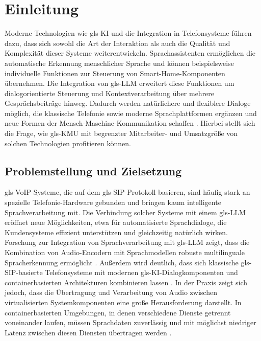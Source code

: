 \chapter{Einleitung}
\label{chap:einleitung}

Moderne Technologien wie \gls{gls-KI} und die Integration in Telefonsysteme führen dazu, dass sich sowohl die Art der Interaktion als auch die Qualität und Komplexität dieser Systeme weiterentwickeln. Sprachassistenten ermöglichen die automatische Erkennung menschlicher Sprache und können beispielsweise individuelle Funktionen zur Steuerung von Smart-Home-Komponenten übernehmen. Die Integration von \gls{gls-LLM} erweitert diese Funktionen um dialogorientierte Steuerung und Kontextverarbeitung über mehrere Gesprächsbeiträge hinweg. Dadurch werden natürlichere und flexiblere Dialoge möglich, die klassische Telefonie sowie moderne Sprachplattformen ergänzen und neue Formen der Mensch-Maschine-Kommunikation schaffen \parencite{Schmiedchen2026KI}. Hierbei stellt sich die Frage, wie \gls{gls-KMU} mit begrenzter Mitarbeiter- und Umsatzgrö\ss e von solchen Technologien profitieren können.

\section{Problemstellung und Zielsetzung}
\gls{gls-VoIP}-Systeme, die auf dem \gls{gls-SIP}-Protokoll basieren, sind häufig stark an spezielle Telefonie-Hardware gebunden und bringen kaum intelligente Sprachverarbeitung mit. Die Verbindung solcher Systeme mit einem \gls{gls-LLM} eröffnet neue Möglichkeiten, etwa für automatisierte Sprachdialoge, die Kundensysteme effizient unterstützen und
gleichzeitig natürlich wirken. Forschung zur Integration von Sprachverarbeitung mit \gls{gls-LLM} zeigt, dass die Kombination von Audio-Encodern mit Sprachmodellen robuste multilinguale Spracherkennung ermöglicht \parencite{whisper_quant_2025}. Au\ss erdem wird deutlich, dass sich klassische \gls{gls-SIP}-basierte Telefonsysteme mit modernen \gls{gls-KI}-Dialogkomponenten und containerbasierten Architekturen kombinieren lassen \parencite{Antonova2025}. In der Praxis zeigt sich jedoch, dass die Übertragung und Verarbeitung von Audio zwischen virtualisierten Systemkomponenten eine gro\ss e Herausforderung darstellt. In containerbasierten Umgebungen, in denen verschiedene Dienste getrennt voneinander laufen, müssen Sprachdaten zuverlässig und mit möglichst niedriger Latenz zwischen diesen Diensten übertragen werden \parencite{ReliabilityVirtualizedNetworks}.

